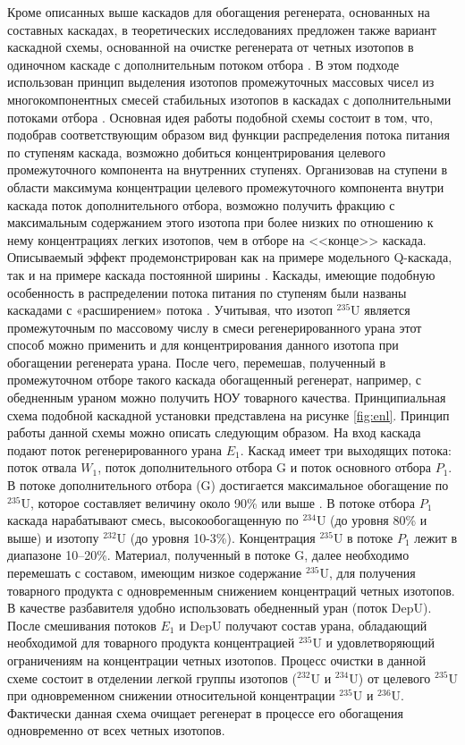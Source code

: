 Кроме описанных выше каскадов для обогащения регенерата, основанных на составных каскадах, в теоретических исследованиях предложен также вариант каскадной схемы, основанной на очистке регенерата от четных изотопов в одиночном каскаде с дополнительным потоком отбора \cite{palkinRestorationIsotopicComposition2020}. В этом подходе использован принцип выделения изотопов промежуточных массовых чисел из многокомпонентных смесей стабильных изотопов в каскадах с дополнительными потоками отбора \cite{smirnovQKASKADYDLYaPOLUChENIYa2013,smirnovVliyanieProfilyaPotoka2010,palkinMnogopotochnyeKaskadyDlya2015}. 
Основная идея работы подобной схемы состоит в том, что, подобрав соответствующим образом вид функции распределения потока питания по ступеням каскада, возможно добиться концентрирования целевого промежуточного компонента на внутренних ступенях. Организовав на ступени в области максимума концентрации целевого промежуточного компонента внутри каскада поток дополнительного отбора, возможно получить фракцию с максимальным содержанием этого изотопа при более низких по отношению к нему концентрациях легких изотопов, чем в отборе на <<конце>> каскада.
Описываемый эффект продемонстрирован как на примере модельного Q-каскада, так и на примере каскада постоянной ширины \cite{smirnovDesignCascadeLocally2015}. Каскады, имеющие подобную особенность в распределении потока питания по ступеням были названы каскадами с «расширением» потока \cite{smirnovVliyanieProfilyaPotoka2010}.
Учитывая, что изотоп $^{235}$U является промежуточным по массовому числу в смеси регенерированного урана этот способ можно применить и для концентрирования данного изотопа при обогащении регенерата урана. После чего, перемешав, полученный в промежуточном отборе такого каскада обогащенный регенерат, например, с обедненным ураном можно получить НОУ товарного качества. 
Принципиальная схема подобной каскадной установки представлена на рисунке \ref{fig:enl}.
Принцип работы данной схемы можно описать следующим образом. На вход каскада подают поток регенерированного урана $E_1$. Каскад имеет три выходящих потока: поток отвала $W_1$, поток дополнительного отбора G и поток основного отбора $P_1$. В потоке дополнительного отбора (G) достигается максимальное обогащение по $^{235}$U, которое составляет величину около 90\% или выше \cite{palkinRestorationIsotopicComposition2020}. В потоке отбора $P_1$ каскада нарабатывают смесь, высокообогащенную по $^{234}$U (до уровня 80\% и выше) и изотопу $^{232}$U (до уровня 10-3\%). Концентрация $^{235}$U в потоке $P_1$ лежит в диапазоне 10–20\%. Материал, полученный в потоке G, далее необходимо перемешать с составом, имеющим низкое содержание $^{235}$U, для получения товарного продукта с одновременным снижением концентраций четных изотопов. В качестве разбавителя удобно использовать обедненный уран (поток DepU). После смешивания потоков $E_1$ и DepU получают состав урана, обладающий необходимой для товарного продукта концентрацией $^{235}$U и удовлетворяющий ограничениям на концентрации четных изотопов.
Процесс очистки в данной схеме состоит в отделении легкой группы изотопов ($^{232}$U и $^{234}$U) от целевого $^{235}$U при одновременном снижении относительной концентрации $^{235}$U и $^{236}$U. Фактически данная схема очищает регенерат в процессе его обогащения одновременно от всех четных изотопов.

